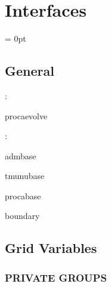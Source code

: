 
\section{Interfaces} 


\parskip = 0pt

\vspace{3mm} \subsection*{General}

: 

procaevolve
\vspace{2mm}

: 

admbase

tmunubase

procabase

boundary
\vspace{2mm}
\subsection*{Grid Variables}
\vspace{5mm}\subsubsection{PRIVATE GROUPS}

\vspace{5mm}

